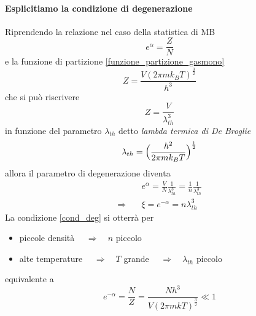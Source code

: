 \paragraph{Esplicitiamo la condizione di degenerazione}
Riprendendo la relazione nel caso della statistica di MB
\begin{equation}
e^{\alpha} = \frac{Z}{N}
\end{equation}
e la funzione di partizione \ref{funzione_partizione_gasmono}
\begin{equation}
Z = \frac{V (2\pi m k_B T)^{ \frac{3}{2} }}{h^3}
\end{equation}
che si può riscrivere 
\begin{equation}
Z = \frac{V}{\lambda_{th}^3}
\end{equation}
in funzione del parametro $\lambda_{th}$ detto \textit{lambda termica di De Broglie}
\begin{equation}
\lambda_{th} = \Bigl(  \frac{h^2}{2 \pi m k_B T}  \Bigr)^{ \frac{1}{2} }
\label{lambda_th_debroglie}
\end{equation}
allora il parametro di degenerazione diventa
\begin{equation}
\begin{split}
& e^{\alpha} = \frac{V}{N} \frac{1}{\lambda_{th}^3} = \frac{1}{n} \frac{1}{\lambda_{th}^3} \\
\Rightarrow\quad & \xi = e^{-\alpha} = n \lambda_{th}^3
\label{disaccordo1}
\end{split}
\end{equation}
La condizione \ref{cond_deg} si otterrà per
\begin{itemize}
\item piccole densità $\quad\Rightarrow\quad n$ piccolo 
\item alte temperature $\quad\Rightarrow\quad T$ grande $\quad\Rightarrow\quad \lambda_{th}$ piccolo
\end{itemize}
equivalente a
\begin{equation}
e^{-\alpha} = \frac{N}{Z} =  \frac{N h^3}{V (2 \pi m k T)^{\frac{3}{2}}} \ll 1
\end{equation}

